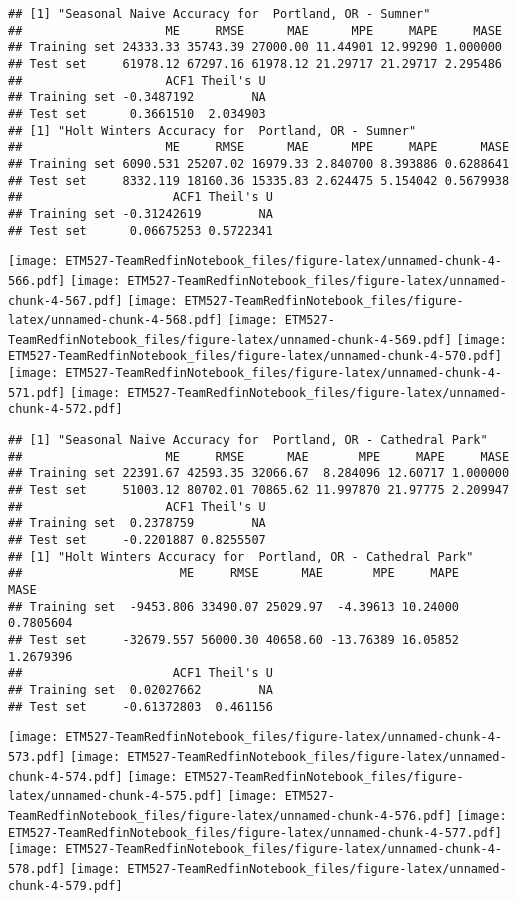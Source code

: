 \documentclass[]{article}
\begin{document}
\begin{verbatim}
## [1] "Seasonal Naive Accuracy for  Portland, OR - Sumner"
##                    ME     RMSE      MAE      MPE     MAPE     MASE
## Training set 24333.33 35743.39 27000.00 11.44901 12.99290 1.000000
## Test set     61978.12 67297.16 61978.12 21.29717 21.29717 2.295486
##                    ACF1 Theil's U
## Training set -0.3487192        NA
## Test set      0.3661510  2.034903
## [1] "Holt Winters Accuracy for  Portland, OR - Sumner"
##                    ME     RMSE      MAE      MPE     MAPE      MASE
## Training set 6090.531 25207.02 16979.33 2.840700 8.393886 0.6288641
## Test set     8332.119 18160.36 15335.83 2.624475 5.154042 0.5679938
##                     ACF1 Theil's U
## Training set -0.31242619        NA
## Test set      0.06675253 0.5722341
\end{verbatim}

\texttt{[image: ETM527-TeamRedfinNotebook\_files/figure-latex/unnamed-chunk-4-566.pdf]}
\texttt{[image: ETM527-TeamRedfinNotebook\_files/figure-latex/unnamed-chunk-4-567.pdf]}
\texttt{[image: ETM527-TeamRedfinNotebook\_files/figure-latex/unnamed-chunk-4-568.pdf]}
\texttt{[image: ETM527-TeamRedfinNotebook\_files/figure-latex/unnamed-chunk-4-569.pdf]}
\texttt{[image: ETM527-TeamRedfinNotebook\_files/figure-latex/unnamed-chunk-4-570.pdf]}
\texttt{[image: ETM527-TeamRedfinNotebook\_files/figure-latex/unnamed-chunk-4-571.pdf]}
\texttt{[image: ETM527-TeamRedfinNotebook\_files/figure-latex/unnamed-chunk-4-572.pdf]}

\begin{verbatim}
## [1] "Seasonal Naive Accuracy for  Portland, OR - Cathedral Park"
##                    ME     RMSE      MAE       MPE     MAPE     MASE
## Training set 22391.67 42593.35 32066.67  8.284096 12.60717 1.000000
## Test set     51003.12 80702.01 70865.62 11.997870 21.97775 2.209947
##                    ACF1 Theil's U
## Training set  0.2378759        NA
## Test set     -0.2201887 0.8255507
## [1] "Holt Winters Accuracy for  Portland, OR - Cathedral Park"
##                      ME     RMSE      MAE       MPE     MAPE      MASE
## Training set  -9453.806 33490.07 25029.97  -4.39613 10.24000 0.7805604
## Test set     -32679.557 56000.30 40658.60 -13.76389 16.05852 1.2679396
##                     ACF1 Theil's U
## Training set  0.02027662        NA
## Test set     -0.61372803  0.461156
\end{verbatim}

\texttt{[image: ETM527-TeamRedfinNotebook\_files/figure-latex/unnamed-chunk-4-573.pdf]}
\texttt{[image: ETM527-TeamRedfinNotebook\_files/figure-latex/unnamed-chunk-4-574.pdf]}
\texttt{[image: ETM527-TeamRedfinNotebook\_files/figure-latex/unnamed-chunk-4-575.pdf]}
\texttt{[image: ETM527-TeamRedfinNotebook\_files/figure-latex/unnamed-chunk-4-576.pdf]}
\texttt{[image: ETM527-TeamRedfinNotebook\_files/figure-latex/unnamed-chunk-4-577.pdf]}
\texttt{[image: ETM527-TeamRedfinNotebook\_files/figure-latex/unnamed-chunk-4-578.pdf]}
\texttt{[image: ETM527-TeamRedfinNotebook\_files/figure-latex/unnamed-chunk-4-579.pdf]}
\end{document}
